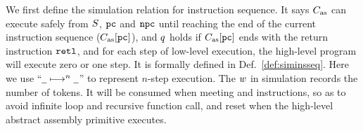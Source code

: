 We first define the simulation relation for 
instruction sequence. 
It says $C_{\text{as}}$ can execute safely
from $S$, $\texttt{pc}$ and $\texttt{npc}$ until reaching
the end of the current instruction sequence ($C_{\text{as}}[\texttt{pc}]$),
and $q$ holds if $C_{\text{as}}[\texttt{pc}]$ ends with the return
instruction $\texttt{retl}{}$, and for each step of low-level 
execution, the high-level program will execute zero or 
one step. 
It is formally defined in Def.~\ref{def:siminsseq}.
Here we use ``$\underline{\ \,} \longmapsto^{n} \underline{\ \,}$'' to
represent $n$-step execution. 
The $w$ in simulation records the number of tokens. 
It will be consumed when meeting \jmp{} and \call{} 
instructions, so as to avoid infinite loop and recursive 
function call, and reset when the high-level 
abstract assembly primitive executes. 

